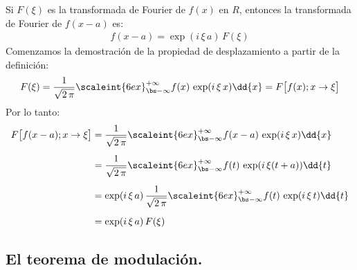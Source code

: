 Si $F (\xi)$ es la transformada de Fourier de $f (x)$ en $R$, entonces la transformada de Fourier de $f(x - a)$ es:
\begin{align*}
f(x - a) = \exp(i \, \xi \, a) \, F (\xi)
\end{align*}
Comenzamos la demostración de la propiedad de desplazamiento a partir de la definición:
\begin{align*}
F (\xi) = \dfrac{1}{\sqrt{2 \, \pi}} \scaleint{6ex}_{\bs -\infty}^{+\infty} f (x) \, \exp(i \, \xi \, x) \dd{x} = F \big[ f (x); x \to \xi \big]
\end{align*}
Por lo tanto:
\begin{align*}
F \big[ f(x - a); x \to \xi \big] &= \dfrac{1}{\sqrt{2 \, \pi}} \scaleint{6ex}_{\bs -\infty}^{+\infty} f(x - a) \, \exp(i \, \xi \, x) \dd{x} \\[0.5em]
&= \dfrac{1}{\sqrt{2 \, \pi}} \scaleint{6ex}_{\bs -\infty}^{+\infty} f(t) \, \exp(i \, \xi (t + a)) \dd{t} \\[0.5em]
&= \exp(i \, \xi \, a) \, \dfrac{1}{\sqrt{2 \, \pi}} \scaleint{6ex}_{\bs -\infty}^{+\infty} f(t) \, \exp(i \, \xi \, t) \dd{t} \\[0.5em]
&= \exp(i \, \xi \, a) \, F (\xi) 
\end{align*}

\subsection{El teorema de modulación.}

